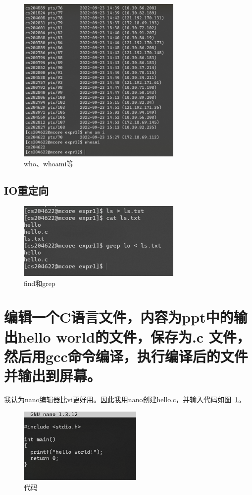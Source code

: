 \documentclass[a4paper,twoside]{article}
\begin{document}
\begin{spacing}{1.2}
\begin{figure}[H]
	\centering
	\includegraphics[width=8.0cm]{who.png}
	\caption{who、whoami等}
\end{figure}

\subsection{IO重定向}

\begin{figure}[H]
	\centering
	\includegraphics[width=8.0cm]{ioredir.png}
	\caption{find和grep}
\end{figure}

\clearpage

\section{编辑一个C语言文件，内容为ppt中的输出hello world的文件，保存为.c 文件，然后用gcc命令编译，执行编译后的文件并输出到屏幕。}

我认为nano编辑器比vi更好用。因此我用nano创建hello.c，并输入代码如图~\ref{fig:hello_code}。

\begin{figure}[htb]
	\centering
	\includegraphics[width=6.0cm]{hello_code.png}
	\caption{代码}
	\label{fig:hello_code}
\end{figure}


\end{spacing}
\end{document}
